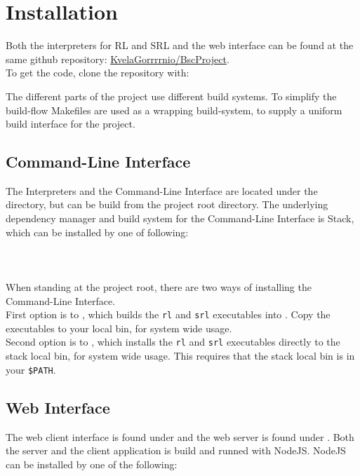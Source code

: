 \section{Installation}

Both the interpreters for RL and SRL and the web interface can be found at the same github repository: \href{https://github.com/KvelaGorrrrnio/BscProject}{KvelaGorrrrnio/BscProject}.\\
To get the code, clone the repository with:

The different parts of the project use different build systems. To simplify the build-flow Makefiles are used as a wrapping build-system, to supply a uniform build interface for the project.

\subsection{Command-Line Interface}
The Interpreters and the Command-Line Interface are located under the  directory, but can be build from the project root directory.
The underlying dependency manager and build system for the Command-Line Interface is Stack, which can be installed by one of following:\\
\\
\\
\\

\noindent
When standing at the project root, there are two ways of installing the Command-Line Interface.\\
First option is to , which builds the \texttt{rl} and \texttt{srl} executables into . Copy the executables to your local bin, for system wide usage.\\
Second option is to , which installs the \texttt{rl} and \texttt{srl} executables directly to the stack local bin, for system wide usage. This requires that the stack local bin is in your \texttt{\$PATH}.

\subsection{Web Interface}

The web client interface is found under  and the web server is found under .
Both the server and the client application is build and runned with NodeJS. NodeJS can be installed by one of the following:\\
\\
\\
\\

